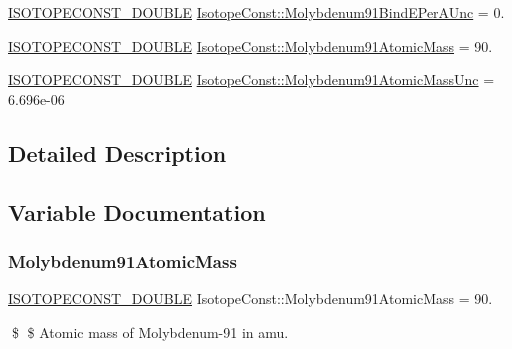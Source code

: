 \begin{DoxyCompactItemize}
\mbox{\hyperlink{group___isotope_const-_macros_ga8f45a7272ce02c0b4c65c44636ed719a}{I\+S\+O\+T\+O\+P\+E\+C\+O\+N\+S\+T\+\_\+\+D\+O\+U\+B\+LE}} \mbox{\hyperlink{group___isotope_const-_molybdenum-_mo91_ga2e7ce42ef8b0bc05c897fc98ba206bc1}{Isotope\+Const\+::\+Molybdenum91\+Bind\+E\+Per\+A\+Unc}} = 0.
\item 
\mbox{\hyperlink{group___isotope_const-_macros_ga8f45a7272ce02c0b4c65c44636ed719a}{I\+S\+O\+T\+O\+P\+E\+C\+O\+N\+S\+T\+\_\+\+D\+O\+U\+B\+LE}} \mbox{\hyperlink{group___isotope_const-_molybdenum-_mo91_gab70cbe74a29011444f69f82b22cd1762}{Isotope\+Const\+::\+Molybdenum91\+Atomic\+Mass}} = 90.
\item 
\mbox{\hyperlink{group___isotope_const-_macros_ga8f45a7272ce02c0b4c65c44636ed719a}{I\+S\+O\+T\+O\+P\+E\+C\+O\+N\+S\+T\+\_\+\+D\+O\+U\+B\+LE}} \mbox{\hyperlink{group___isotope_const-_molybdenum-_mo91_gac5e2119b17d80124d953b3ac27348a52}{Isotope\+Const\+::\+Molybdenum91\+Atomic\+Mass\+Unc}} = 6.\+696e-\/06
\end{DoxyCompactItemize}


\subsection{Detailed Description}


\subsection{Variable Documentation}
\mbox{\label{group___isotope_const-_molybdenum-_mo91_gab70cbe74a29011444f69f82b22cd1762}} 
\subsubsection{\texorpdfstring{Molybdenum91\+Atomic\+Mass}{Molybdenum91AtomicMass}}
{\footnotesize\ttfamily \mbox{\hyperlink{group___isotope_const-_macros_ga8f45a7272ce02c0b4c65c44636ed719a}{I\+S\+O\+T\+O\+P\+E\+C\+O\+N\+S\+T\+\_\+\+D\+O\+U\+B\+LE}} Isotope\+Const\+::\+Molybdenum91\+Atomic\+Mass = 90.}

\$ \$ Atomic mass of Molybdenum-\/91 in amu. \mbox{\label{group___isotope_const-_molybdenum-_mo91_gac5e2119b17d80124d953b3ac27348a52}} 
